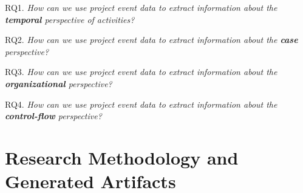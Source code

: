 
\begin{inparadesc}
	\item[RQ1.] \emph{How can we use project event data to extract information about the \textbf{temporal} perspective of activities?} 
	
	\item[RQ2.] \emph{How can we use project event data to extract information about the \textbf{case} perspective?} 
	
	\item[RQ3.] \emph{How can we use project event data to extract information about the \textbf{organizational} perspective?} 
	
	\item[RQ4.] \emph{How can we use project event data to extract information about the \textbf{control-flow} perspective?} 
	
\end{inparadesc}

\section{Research Methodology and Generated Artifacts}
\label{sec:intro-research-paradigm}

%	
%	

